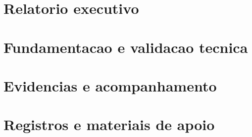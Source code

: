 \documentclass[12pt,a4paper,oneside]{report}
\begin{document}
\tableofcontents
\listoffigures
\clearpage
{}

\part{Relatorio executivo}





\part{Fundamentacao e validacao tecnica}










\part{Evidencias e acompanhamento}










\appendix
\part{Registros e materiais de apoio}




\end{document}
